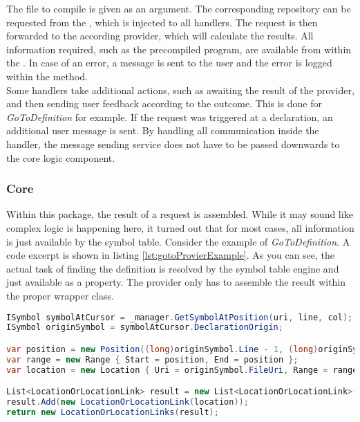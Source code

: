 The file to compile is given as an argument.
The corresponding repository can be requested from the , which is injected to all handlers.
The request is then forwarded to the according provider, which will calculate the results.
All information required, such as the precompiled program, are available from within the .
In case of an error, a message is sent to the user and the error is logged within the  method.\\

Some handlers take additional actions, such as awaiting the result of the provider, and then sending user feedback according to the outcome.
This is done for \textit{GoToDefinition} for example.
If the request was triggered at a declaration, an additional user message is sent.
By handling all communication inside the handler, the message sending service does not have to be passed downwards to the core logic component.


\subsubsection{Core}
Within this package, the result of a request is assembled.
While it may sound like complex logic is happening here, it turned out that for most cases, all information is just available by the symbol table.
Consider the example of \textit{GoToDefinition}.
A code excerpt is shown in listing \ref{lst:gotoProvierExample}.
As you can see, the actual task of finding the definition is resolved by the symbol table engine and just available as a property.
The provider only has to assemble the result within the proper wrapper class.

\begin{lstlisting}[language=csharp, caption={\textit{GoToDefinition}, Core Provider}, captionpos=b, label={lst:gotoProvierExample}]
ISymbol symbolAtCursor = _manager.GetSymbolAtPosition(uri, line, col);
ISymbol originSymbol = symbolAtCursor.DeclarationOrigin;

var position = new Position((long)originSymbol.Line - 1, (long)originSymbol.Column - 1);
var range = new Range { Start = position, End = position };
var location = new Location { Uri = originSymbol.FileUri, Range = range };

List<LocationOrLocationLink> result = new List<LocationOrLocationLink>();
result.Add(new LocationOrLocationLink(location));
return new LocationOrLocationLinks(result);
\end{lstlisting}

